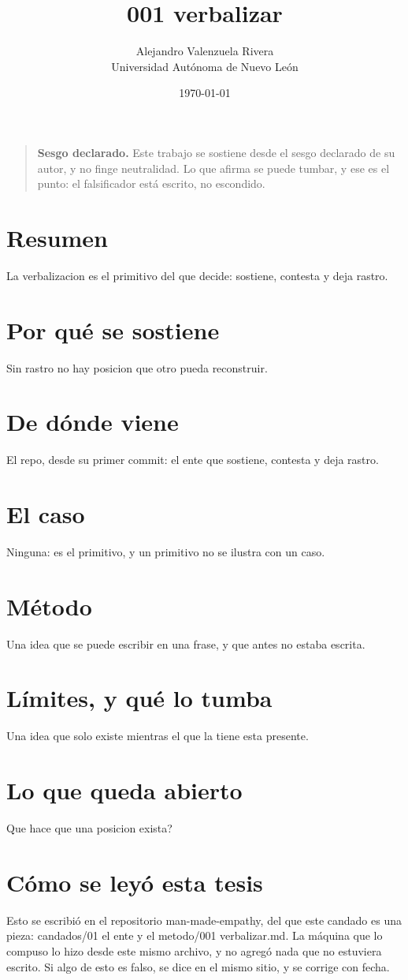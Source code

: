 \documentclass[11pt,a4paper]{article}
\title{001 verbalizar}
\author{Alejandro Valenzuela Rivera\\\small Universidad Autónoma de Nuevo León}
\date{\today}
\begin{document}
\maketitle

\begin{quote}
\textbf{Sesgo declarado.} Este trabajo se sostiene desde el sesgo declarado de su autor, y no finge neutralidad. Lo que afirma se puede tumbar, y ese es el punto: el falsificador está escrito, no escondido.
\end{quote}

\section*{Resumen}
La verbalizacion es el primitivo del que decide: sostiene, contesta y deja rastro.

\section{Por qué se sostiene}
Sin rastro no hay posicion que otro pueda reconstruir.

\section{De dónde viene}
El repo, desde su primer commit: el ente que sostiene, contesta y deja rastro.

\section{El caso}
Ninguna: es el primitivo, y un primitivo no se ilustra con un caso.

\section{Método}
Una idea que se puede escribir en una frase, y que antes no estaba escrita.

\section{Límites, y qué lo tumba}
Una idea que solo existe mientras el que la tiene esta presente.

\section{Lo que queda abierto}
\textquestiondown{}Que hace que una posicion exista?

\section*{Cómo se leyó esta tesis}
Esto se escribió en el repositorio man-made-empathy, del que este candado es una pieza: candados/01 el ente y el metodo/001 verbalizar.md. La máquina que lo compuso lo hizo desde este mismo archivo, y no agregó nada que no estuviera escrito. Si algo de esto es falso, se dice en el mismo sitio, y se corrige con fecha.
\end{document}
